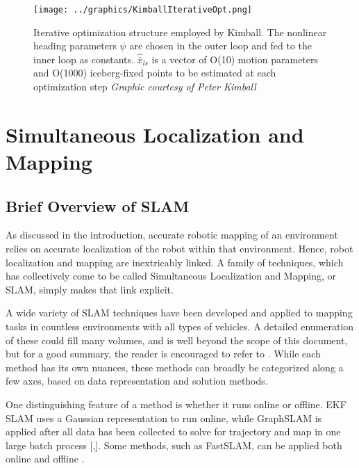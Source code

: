 \begin{figure}[htbp]
   \centering
   \texttt{[image: ../graphics/KimballIterativeOpt.png]} %
   \caption{Iterative optimization structure employed by Kimball. The nonlinear heading parameters $\psi$ are chosen in the outer loop and fed to the inner loop as constants. $\hat{\bar{x}}_{ls}$ is a vector of O(10) motion parameters and O(1000) iceberg-fixed points to be estimated at each optimization step  \emph{Graphic courtesy of Peter Kimball}}
   \label{fig:NestedLoopRelatedWork}
\end{figure}

\section{Simultaneous Localization and Mapping}

\subsection{Brief Overview of SLAM}

As discussed in the introduction, accurate robotic mapping of an environment relies on accurate localization of the robot within that environment. Hence, robot localization and mapping are inextricably linked. A family of techniques, which has collectively come to be called Simultaneous Localization and Mapping, or SLAM, simply makes that link explicit. 

A wide variety of SLAM techniques have been developed and applied to mapping tasks in countless environments with all types of vehicles. A detailed enumeration of these could fill many volumes, and is well beyond the scope of this document, but for a good summary, the reader is encouraged to refer to \cite{SLAMoverview}. While each method has its own nuances, these methods can broadly be categorized along a few axes, based on data representation and solution methods. 

One distinguishing feature of a method is whether it runs online or offline. EKF SLAM uses a Gaussian representation to run online, while GraphSLAM is applied after all data has been collected to solve for trajectory and map in one large batch process [\cite{},\cite{}]. Some methods, such as FastSLAM, can be applied both online and offline \cite{FastSLAM}.

